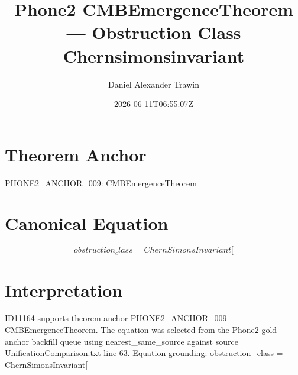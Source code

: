\documentclass[11pt]{article}
\title{Phone2 CMBEmergenceTheorem — Obstruction Class Chernsimonsinvariant}
\author{Daniel Alexander Trawin}
\date{2026-06-11T06:55:07Z}
\begin{document}
\maketitle
\section*{Theorem Anchor}
PHONE2_ANCHOR_009: CMBEmergenceTheorem
\section*{Canonical Equation}
\[
obstruction_class = ChernSimonsInvariant[
\]
\section*{Interpretation}
ID11164 supports theorem anchor PHONE2_ANCHOR_009 CMBEmergenceTheorem. The equation was selected from the Phone2 gold-anchor backfill queue using nearest_same_source against source UnificationComparison.txt line 63. Equation grounding: obstruction_class = ChernSimonsInvariant[
\end{document}

